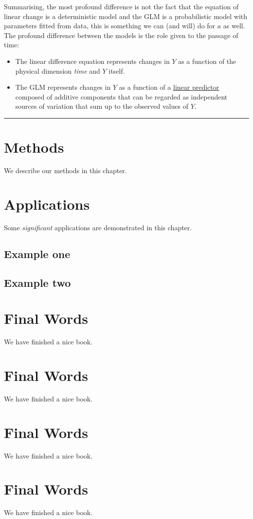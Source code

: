 \documentclass[12pt,]{book}
\providecommand{\tightlist}{%
  \setlength{\itemsep}{0pt}\setlength{\parskip}{0pt}}
\let\stdsection\section
\renewcommand\section{\newpage\stdsection}
\theoremstyle{definition}
\theoremstyle{definition}
\theoremstyle{definition}
\theoremstyle{remark}
\begin{document}
Summarising, the most profound difference is not the fact that the
equation of linear change is a deterministic model and the GLM is a
probabilistic model with parameters fitted from data, this is something
we can (and will) do for \(a\) as well. The profound difference between
the models is the role given to the passage of time:

\begin{itemize}
\tightlist
\item
  The linear difference equation represents changes in \(Y\) as a
  function of the physical dimension \emph{time} and \(Y\) itself.
\item
  The GLM represents changes in \(Y\) as a function of a
  \href{https://en.wikipedia.org/wiki/Linear_predictor_function}{linear
  predictor} composed of additive components that can be regarded as
  independent sources of variation that sum up to the observed values of
  \(Y\).
\end{itemize}

\begin{center}\rule{0.5\linewidth}{\linethickness}\end{center}

\chapter{Methods}\label{methods}

We describe our methods in this chapter.

\chapter{Applications}\label{applications}

Some \emph{significant} applications are demonstrated in this chapter.

\section{Example one}\label{example-one}

\section{Example two}\label{example-two}

\chapter{Final Words}\label{final-words}

We have finished a nice book.

\chapter{Final Words}\label{final-words-1}

We have finished a nice book.

\chapter{Final Words}\label{final-words-2}

We have finished a nice book.

\chapter{Final Words}\label{final-words-3}

We have finished a nice book.


\end{document}
